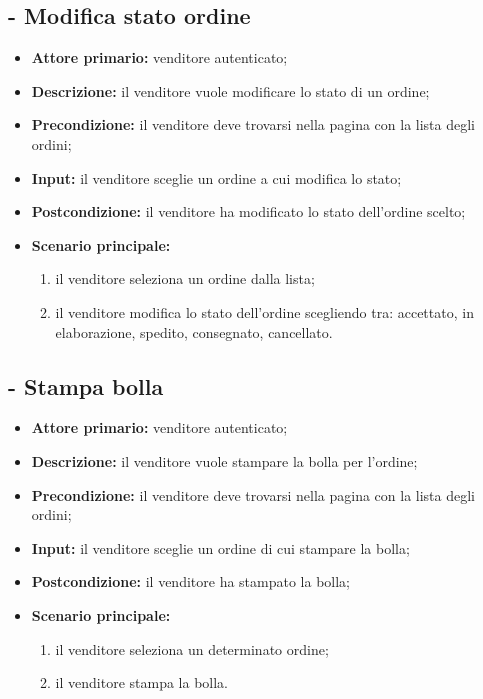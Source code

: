 \subsection{- Modifica stato ordine}
\begin{itemize}
    \item \textbf{Attore primario:} venditore autenticato;
    \item \textbf{Descrizione:} il venditore vuole modificare lo stato di un ordine;
    \item \textbf{Precondizione:} il venditore deve trovarsi nella pagina con la lista degli ordini;
    \item \textbf{Input:} il venditore sceglie un ordine a cui modifica lo stato;
    \item \textbf{Postcondizione:} il venditore ha modificato lo stato dell'ordine scelto;
    \item \textbf{Scenario principale:}
          \begin{enumerate}
              \item il venditore seleziona un ordine dalla lista;
              \item il venditore modifica lo stato dell'ordine scegliendo tra: accettato, in elaborazione, spedito, consegnato, cancellato.
          \end{enumerate}
\end{itemize}

\stepUserCase
\subsection{- Stampa bolla}
\begin{itemize}
    \item \textbf{Attore primario:} venditore autenticato;
    \item \textbf{Descrizione:} il venditore vuole stampare la bolla per l'ordine;
    \item \textbf{Precondizione:} il venditore deve trovarsi nella pagina con la lista degli ordini;
    \item \textbf{Input:} il venditore sceglie un ordine di cui stampare la bolla;
    \item \textbf{Postcondizione:} il venditore ha stampato la bolla;
    \item \textbf{Scenario principale:}
          \begin{enumerate}
              \item il venditore seleziona un determinato ordine;
              \item il venditore stampa la bolla.
          \end{enumerate}
\end{itemize}
